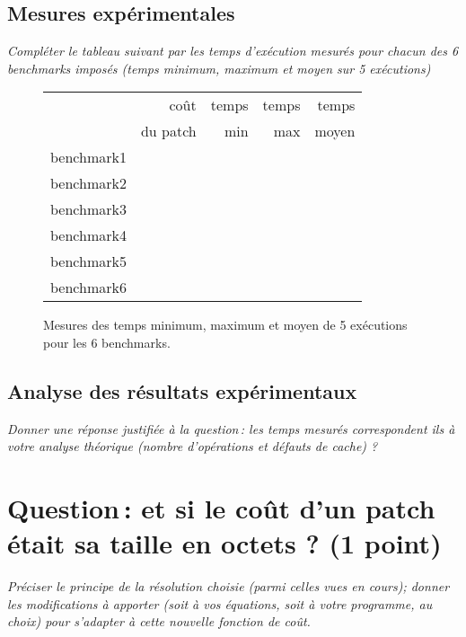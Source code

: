 \documentclass[a4paper, 10pt, french]{article}
\begin{document}
  \subsection{Mesures expérimentales}
    {\em Compléter le tableau suivant par les temps d'exécution mesurés pour chacun des 6 benchmarks imposés
              (temps minimum, maximum et moyen sur 5 exécutions)
    }

    \begin{figure}[h]
      \begin{center}
        \begin{tabular}{|l||r||r|r|r||}
          \hline
          \hline
            & coût         & temps     & temps   & temps \\
            & du patch     & min       & max     & moyen \\
          \hline
          \hline
            benchmark1 &      &     &     &     \\
          \hline
            benchmark2 &      &     &     &     \\
          \hline
            benchmark3 &      &     &     &     \\
          \hline
            benchmark4 &      &     &     &     \\
          \hline
            benchmark5 &      &     &     &     \\
          \hline
            benchmark6 &      &     &     &     \\
          \hline
          \hline
        \end{tabular}
        \caption{Mesures des temps minimum, maximum et moyen de 5 exécutions pour les 6 benchmarks.}
        \label{table-temps}
      \end{center}
    \end{figure}

\subsection{Analyse des résultats expérimentaux}
{\em Donner  une réponse justifiée  à la question\,: 
              les  temps mesurés correspondent ils  à votre analyse théorique (nombre d’opérations et défauts de cache) ?
}

\section{Question\,: et  si le coût d'un patch était sa taille en octets ? (1 point)}
{\em Préciser le principe de la résolution choisie (parmi celles vues en cours); donner  les modifications à apporter (soit à vos  équations, soit à votre programme, au choix) 
pour s'adapter à cette nouvelle fonction de coût. 
}
\end{document}
